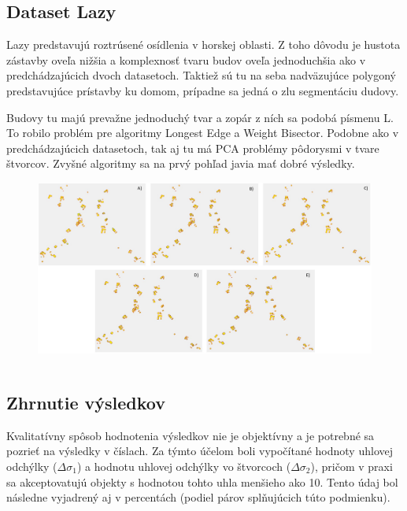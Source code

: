 \documentclass[12pt]{article}
\begin{document}
\subsection*{Dataset Lazy}
Lazy predstavujú roztrúsené osídlenia v horskej oblasti. Z toho dôvodu je hustota zástavby oveľa nižšia a komplexnosť tvaru budov oveľa jednoduchšia ako v predchádzajúcich dvoch datasetoch. Taktiež sú tu na seba nadväzujúce polygoný predstavujúce prístavby ku domom, prípadne sa jedná o zlu segmentáciu dudovy. \par
Budovy tu majú prevažne jednoduchý tvar a zopár z ních sa podobá písmenu L. To robilo problém pre algoritmy Longest Edge a Weight Bisector. Podobne ako v predchádzajúcich datasetoch, tak aj tu má PCA problémy pôdorysmi v tvare štvorcov. Zvyšné algoritmy sa na prvý pohľad javia mať dobré výsledky.
\begin{figure}[h]
    \centering
    \includegraphics[width=1\linewidth]{latex/image/lazy.jpg}
     \label{fig:enter-label}
\end{figure}
$$$$
\subsection*{Zhrnutie výsledkov}
Kvalitatívny spôsob hodnotenia výsledkov nie je objektívny a je potrebné sa pozrieť na výsledky v číslach. Za týmto účelom boli vypočítané hodnoty uhlovej odchýlky ($\Delta\sigma_{1}$) a hodnotu uhlovej odchýlky vo štvorcoch ($\Delta\sigma_{2}$), pričom v praxi sa akceptovatujú objekty s hodnotou tohto uhla menšieho ako 10. Tento údaj bol následne vyjadrený aj v percentách (podiel párov splňujúcich túto podmienku).
\end{document}
